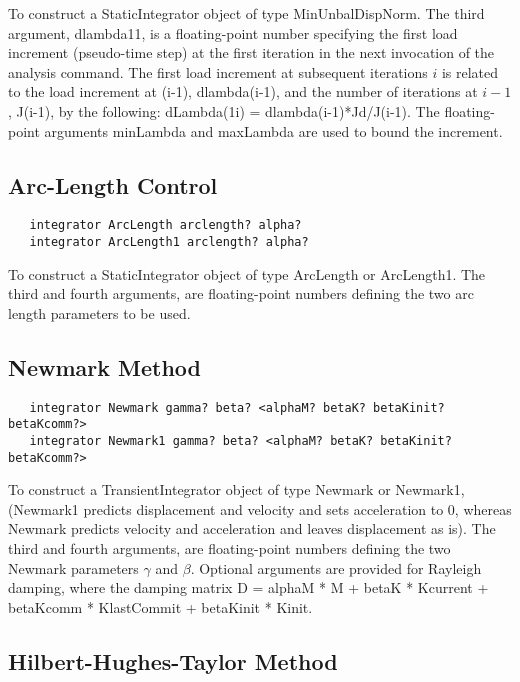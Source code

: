 \documentclass[12pt]{article}
\begin{document}
To construct a StaticIntegrator object of type MinUnbalDispNorm. The third
argument, dlambda11, is a floating-point number specifying the first
load increment (pseudo-time step) at the first iteration in the next
invocation of the analysis command. The first load increment at subsequent
iterations $i$ is related to the load increment at (i-1),
dlambda(i-1), and the number of iterations at $i-1$, J(i-1), by the
following: dLambda(1i) = dlambda(i-1)*Jd/J(i-1). The floating-point
arguments minLambda and maxLambda are used to bound the increment.

\subsection{Arc-Length Control}

{\sf\small
\begin{verbatim}
   integrator ArcLength arclength? alpha?
   integrator ArcLength1 arclength? alpha?
\end{verbatim}
}

To construct a StaticIntegrator object of type ArcLength or
ArcLength1. The third and fourth arguments, are floating-point numbers
defining the two arc length parameters to be used.

\subsection{Newmark Method}

{\sf\small
\begin{verbatim}
   integrator Newmark gamma? beta? <alphaM? betaK? betaKinit? betaKcomm?> 
   integrator Newmark1 gamma? beta? <alphaM? betaK? betaKinit? betaKcomm?> 
\end{verbatim}
}

To construct a TransientIntegrator object of type Newmark or Newmark1,
(Newmark1 predicts displacement and velocity and sets acceleration to
$0$, whereas Newmark predicts velocity and acceleration and leaves
displacement as is). The third and fourth arguments, are
floating-point numbers defining the two Newmark parameters $\gamma$ and
$\beta$. Optional arguments are provided for Rayleigh damping, where
the damping matrix D = alphaM * M + betaK * Kcurrent + betaKcomm *
KlastCommit + betaKinit * Kinit.

\subsection{Hilbert-Hughes-Taylor Method}
\end{document}
